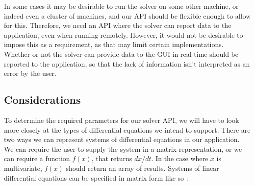 \documentclass[../../main.tex]{subfiles}
\begin{document}
In some cases it may be desirable to run the solver on some other machine, or indeed even a cluster of machines, and our API should be flexible enough to allow for this.
Therefore, we need an API where the solver can report data to the application, even when running remotely.
However, it would not be desirable to impose this as a requirement, as that may limit certain implementations.
Whether or not the solver can provide data to the GUI in real time should be reported to the application, so that the lack of information isn't interpreted as an error by the user.

\subsection{Considerations}

To determine the required parameters for our solver API, we will have to look more closely at the types of differential equations we intend to support.
There are two ways we can represent systems of differential equations in our application.
We can require the user to supply the system in a matrix representation, or we can require a function $f(x)$, that returns $dx/dt$.
In the case where $x$ is multivariate, $f(x)$ should return an array of results.
Systems of linear differential equations can be specified in matrix form like so \cite{kreyzig}:
\end{document}
